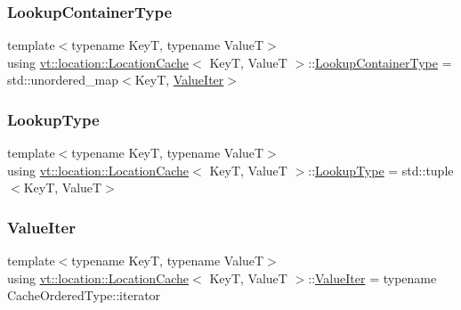 \subsubsection{\texorpdfstring{Lookup\+Container\+Type}{LookupContainerType}}
{\footnotesize\ttfamily template$<$typename KeyT, typename ValueT$>$ \\
using \hyperlink{structvt_1_1location_1_1_location_cache}{vt\+::location\+::\+Location\+Cache}$<$ KeyT, ValueT $>$\+::\hyperlink{structvt_1_1location_1_1_location_cache_af56948d938dcc38705b777a96b3100be}{Lookup\+Container\+Type} =  std\+::unordered\+\_\+map$<$KeyT, \hyperlink{structvt_1_1location_1_1_location_cache_a67dc1e71785f1c8aa3b1e02d802977b8}{Value\+Iter}$>$}

\mbox{\label{structvt_1_1location_1_1_location_cache_a8a5ea74b02aaaa77820bf2504bda1175}} 
\subsubsection{\texorpdfstring{Lookup\+Type}{LookupType}}
{\footnotesize\ttfamily template$<$typename KeyT, typename ValueT$>$ \\
using \hyperlink{structvt_1_1location_1_1_location_cache}{vt\+::location\+::\+Location\+Cache}$<$ KeyT, ValueT $>$\+::\hyperlink{structvt_1_1location_1_1_location_cache_a8a5ea74b02aaaa77820bf2504bda1175}{Lookup\+Type} =  std\+::tuple$<$KeyT, ValueT$>$}

\mbox{\label{structvt_1_1location_1_1_location_cache_a67dc1e71785f1c8aa3b1e02d802977b8}} 
\subsubsection{\texorpdfstring{Value\+Iter}{ValueIter}}
{\footnotesize\ttfamily template$<$typename KeyT, typename ValueT$>$ \\
using \hyperlink{structvt_1_1location_1_1_location_cache}{vt\+::location\+::\+Location\+Cache}$<$ KeyT, ValueT $>$\+::\hyperlink{structvt_1_1location_1_1_location_cache_a67dc1e71785f1c8aa3b1e02d802977b8}{Value\+Iter} =  typename Cache\+Ordered\+Type\+::iterator}



